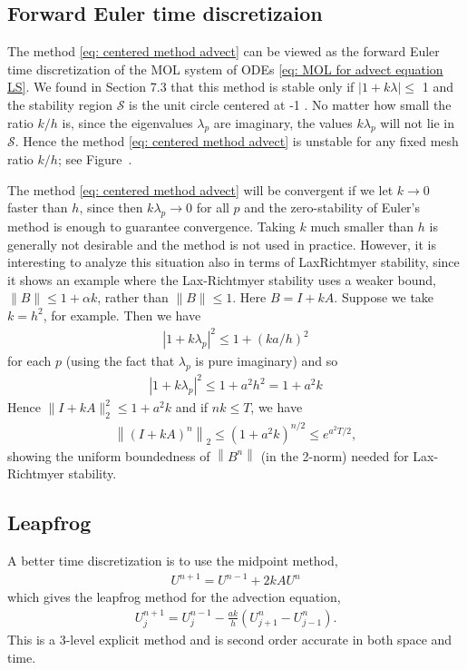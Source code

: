 \subsection{Forward Euler time discretizaion}
The method \eqref{eq: centered method advect} can be viewed as the forward Euler time discretization of the MOL system of ODEs \eqref{eq: MOL for advect equation LS}. We found in Section 7.3 that this method is stable only if $|1+k \lambda| \leq$ 1 and the stability region $\mathcal{S}$ is the unit circle centered at -1 . No matter how small the ratio $k / h$ is, since the eigenvalues $\lambda_p$ are imaginary, the values $k \lambda_p$ will not lie in $\mathcal{S}$. Hence the method \eqref{eq: centered method advect} is unstable for any fixed mesh ratio $k / h$; see Figure~\wc. 

The method \eqref{eq: centered method advect} will be convergent if we let $k \rightarrow 0$ faster than $h$, since then $k \lambda_p \rightarrow 0$ for all $p$ and the zero-stability of Euler's method is enough to guarantee convergence. Taking $k$ much smaller than $h$ is generally not desirable and the method is not used in practice. However, it is interesting to analyze this situation also in terms of LaxRichtmyer stability, since it shows an example where the Lax-Richtmyer stability uses a weaker bound, $\|B\| \leq 1+\alpha k$, rather than $\|B\| \leq 1$. Here $B=I+k A$. Suppose we take $k=h^2$, for example. Then we have
\begin{align*}
\left|1+k \lambda_p\right|^2 \leq 1+(k a / h)^2
\end{align*}
for each $p$ (using the fact that $\lambda_p$ is pure imaginary) and so
\begin{align*}
\left|1+k \lambda_p\right|^2 \leq 1+a^2 h^2=1+a^2 k
\end{align*}
Hence $\|I+k A\|_2^2 \leq 1+a^2 k$ and if $n k \leq T$, we have
\begin{align*}
\left\|(I+k A)^n\right\|_2 \leq\left(1+a^2 k\right)^{n / 2} \leq e^{a^2 T / 2},
\end{align*}
showing the uniform boundedness of $\left\|B^n\right\|$ (in the 2-norm) needed for Lax-Richtmyer stability.

\subsection{Leapfrog}
A better time discretization is to use the midpoint method,
\begin{align*}
U^{n+1}=U^{n-1}+2 k A U^n
\end{align*}
which gives the leapfrog method for the advection equation,
\begin{align}
    \label{eq: Leapfrog advection equation}
U_j^{n+1}=U_j^{n-1}-\frac{a k}{h}\left(U_{j+1}^n-U_{j-1}^n\right) .
\end{align}
This is a 3-level explicit method and is second order accurate in both space and time.


